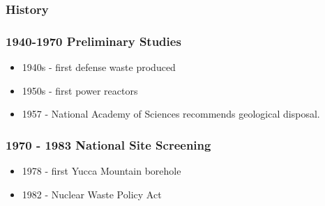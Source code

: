 
\begin{frame}[ctb!]
  \frametitle{History}
  
\end{frame}
\begin{frame}[ctb!]
  \frametitle{1940-1970 Preliminary Studies}
  \begin{itemize}
    \item 1940s - first defense waste produced
    \item 1950s - first power reactors
    \item 1957 - National Academy of Sciences recommends geological disposal.
  \end{itemize}
\end{frame}

\begin{frame}[ctb!]
  \frametitle{1970 - 1983 National Site Screening}
  \begin{itemize}
    \item 1978 - first Yucca Mountain borehole
    \item 1982 - Nuclear Waste Policy Act
  \end{itemize}
\end{frame}


